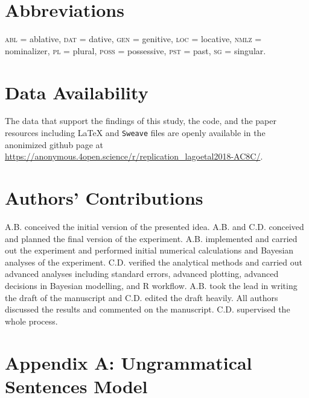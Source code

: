 \documentclass[brill,linguex]{glossa}\usepackage[]{graphicx}\usepackage[]{color}
\begin{document}
  
\section*{Abbreviations} %


\textsc{abl} = ablative, \textsc{dat} = dative, \textsc{gen} = genitive, \textsc{loc} = locative, \textsc{nmlz} = nominalizer, \textsc{pl} = plural, \textsc{poss} = possessive, \textsc{pst} = past, \textsc{sg} = singular. %



\section*{Data Availability} %


The data that support the findings of this study, the code, and the paper resources including \LaTeX{} and \texttt{Sweave} files are openly available in the anonimized github page at \url{https://anonymous.4open.science/r/replication_lagoetal2018-AC8C/}. %


\section*{Authors' Contributions} %


A.B. conceived the initial version of the presented idea. A.B. and C.D. conceived and planned the final version of the experiment. A.B. implemented and carried out the experiment and performed initial numerical calculations and Bayesian analyses of the experiment. C.D. verified the analytical methods and carried out advanced analyses including \citet{Cousineau:2007} standard errors, advanced plotting, advanced decisions in Bayesian modelling, and R workflow. A.B. took the lead in writing the draft of the manuscript and C.D. edited the draft heavily. All authors discussed the results and commented on the manuscript. C.D. supervised the whole process. %




\section*{Appendix A: Ungrammatical Sentences Model}
\end{document}
